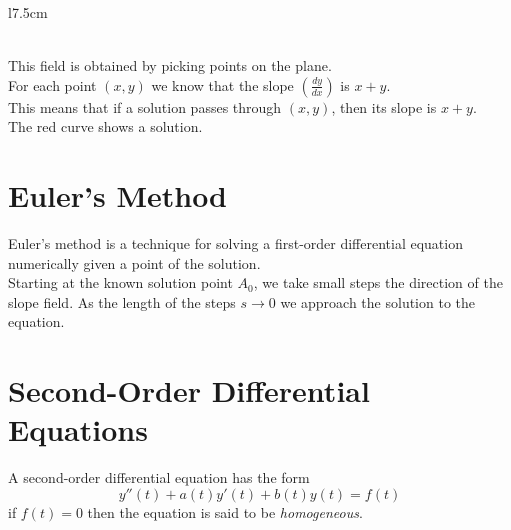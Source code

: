 \documentclass{article}
\begin{document}
\begin{wrapfigure}{l}{7.5cm}
\end{wrapfigure}

\phantom{ } \\

This field is obtained by picking points on the plane. \\
For each point \((x,y)\) we know that the slope \((\frac{dy}{dx})\)
is \(x + y\). \\
This means that if a solution passes through \((x,y)\), then its slope is \(x+y\). \\
The red curve shows a solution.

\wrapfill

\section{Euler's Method}

Euler's method is a technique for solving a 
first-order differential equation numerically given a point of the solution.
\\
Starting at the known solution point \(A_0\), we take small steps the direction
of the slope field. As the length of the steps \(s \to 0\)
we approach the solution to the equation. \\

\pagebreak

\section{Second-Order Differential Equations}

A second-order differential equation has the form
\[
    y''(t)+a(t)y'(t)+b(t)y(t)=f(t)
\]
if \(f(t)=0\) then the equation is said to be \textit{homogeneous}.

\end{document}
